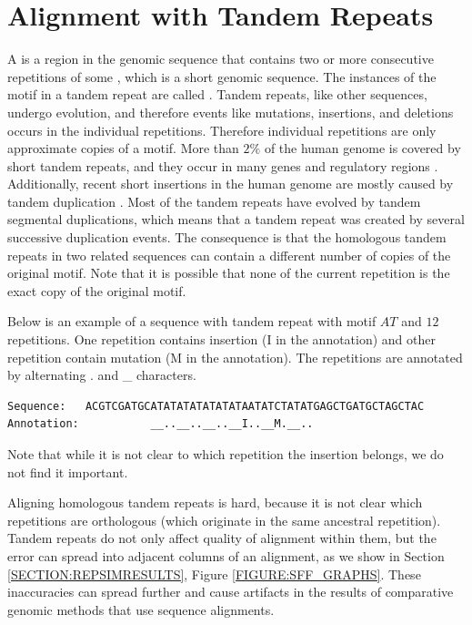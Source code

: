 \chapter{Alignment with Tandem Repeats} \label{CHAPTER:REP}

A  is a region in the genomic sequence that contains
two or more consecutive repetitions of some , which is a
short genomic sequence. The instances of the motif in a tandem repeat are
called .  Tandem repeats, like other sequences, undergo
evolution, and therefore events like mutations, insertions, and deletions
occurs in the individual repetitions.  Therefore individual repetitions are
only approximate copies of a motif.  More than $2\%$ of the human genome is
covered by short tandem repeats, and they occur in many genes and regulatory
regions \cite{Gemayel2010}. Additionally, recent short insertions in the human
genome are mostly caused by tandem duplication \cite{Messer2007}. Most of the
tandem repeats have evolved by tandem segmental duplications, which means that
a tandem repeat was created by several successive duplication events. The
consequence is that the homologous tandem repeats in two related sequences can
contain a different number of copies of the original motif. Note that it is
possible that none of the current repetition is the exact copy of the original
motif. 
\begin{example}
Below is an example of a sequence with tandem repeat with motif $AT$ and $12$
repetitions.  One repetition contains insertion (I in the annotation) and other
repetition contain mutation (M in the annotation). The repetitions are
annotated by alternating . and \_ characters.
\begin{verbatim}
Sequence:   ACGTCGATGCATATATATATATATAATATCTATATGAGCTGATGCTAGCTAC
Annotation:           __..__..__..__I..__M.__..
\end{verbatim}
Note that while it is not clear to which repetition the insertion belongs, we
do not find it important.
\end{example}

Aligning homologous tandem repeats is hard, because it is not clear which
repetitions are orthologous (which originate in the same ancestral repetition).
Tandem repeats do not only affect quality of alignment within them, but the
error can spread into adjacent columns of an alignment, as we show in Section
\ref{SECTION:REPSIMRESULTS}, Figure \ref{FIGURE:SFF_GRAPHS}.  These
inaccuracies can spread further and cause artifacts in the results of
comparative genomic methods that use sequence alignments.

